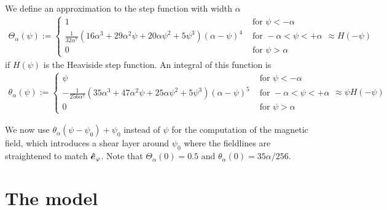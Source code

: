 We define an approximation to the step function with width $\alpha$
\begin{align}
\Theta_\alpha(\psi) := \begin{cases}
    1 & \text{ for } \psi < - \alpha  \\
    \frac{1}{32 \alpha^7}  \left(16 \alpha^3+29 \alpha^2 \psi+20 \alpha \psi^2+5 \psi^3\right) (\alpha-\psi)^4
    &\text{ for } -\alpha<\psi<+\alpha \\
    0 & \text{ for } \psi > \alpha 
\end{cases}
    \approx H(-\psi)
\label{eq:approx_heaviside}
\end{align}
if $H(\psi)$ is the Heaviside step function.
An integral of this function is
\begin{align}
\theta_\alpha(\psi) := \begin{cases}
\psi &\text{ for } \psi < -\alpha \\
    - \frac{1}{256 \alpha^7} \left(35 \alpha^3+47 \alpha^2 \psi+25 \alpha \psi^2+5 \psi^3\right) (\alpha-\psi)^5
     &\text{ for } -\alpha<\psi<+\alpha \\
    0 &\text{ for } \psi > \alpha
\end{cases}
    \approx \psi H(-\psi)
\label{eq:modified_psi}
\end{align}

We now use $\theta_\alpha(\psi-\psi_0)+\psi_0$ instead of $\psi$ for the computation of the
magnetic field, which introduces a shear layer around $\psi_0$ where the
fieldlines are straightened to match $\bm{\hat{e}}_\varphi$.
Note that $\Theta_\alpha(0) = 0.5$ and $\theta_\alpha(0) = 35\alpha/256$.

\section{The model} \label{sec:model}
